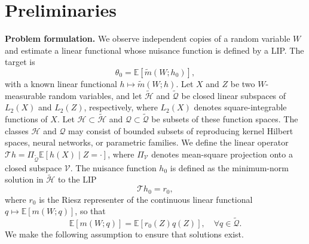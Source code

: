 \documentclass[12pt]{article}
\theoremstyle{plain}
\theoremstyle{definition}
\theoremstyle{remark}
\begin{document}
\section{Preliminaries}\label{sec:pre}

\textbf{Problem formulation.} We observe independent copies of a random variable $W$ and estimate a linear functional whose nuisance function is defined by a LIP. The target is 
\[
\theta _{0} =\mathbb{E} [\tilde{m} (W;h_{0} )],
\]
with a known linear functional $h\mapsto \tilde{m} (W;h)$. Let $X$ and $Z$ be two $W$-measurable random variables, and let $ \tilde{\mathcal{H}}$ and $ \tilde{\mathcal{Q}}$ be closed linear subspaces of $ L_{2}( X)$ and $ L_{2}( Z)$, respectively, where $L_2(X)$ denotes square-integrable functions of $X$. Let $\mathcal{H} \subset \tilde{\mathcal{H}}$ and $\mathcal{Q} \subset \tilde{\mathcal{Q}}$ be subsets of these function spaces. The classes $\mathcal H$ and $\mathcal Q$ may consist of bounded subsets of reproducing kernel Hilbert spaces, neural networks, or parametric families. We define the linear operator $ \mathcal{T} h=\Pi _{\tilde{\mathcal{Q}}}\mathbb{E}[ h( X) \mid Z=\cdot ]$, where $ \Pi _{\mathcal{V}}$ denotes mean-square projection onto a closed subspace $ \mathcal{V}$. The nuisance function $h_{0}$ is defined as the minimum-norm solution in $\tilde{\mathcal{H}}$ to the LIP
\begin{equation}\label{eq:lin_inv_prob}
\mathcal{T} h_0=r_{0} ,
\end{equation}
where $r_0$ is the Riesz representer of the continuous linear functional $q\mapsto\mathbb E[m(W;q)]$, so that 
\[
\mathbb{E}[ m( W;q)] =\mathbb{E}[ r_0( Z) q( Z)] ,\quad \forall q\in \tilde{\mathcal{Q}} .
\]
We make the following assumption to ensure that solutions exist. 
\end{document}
